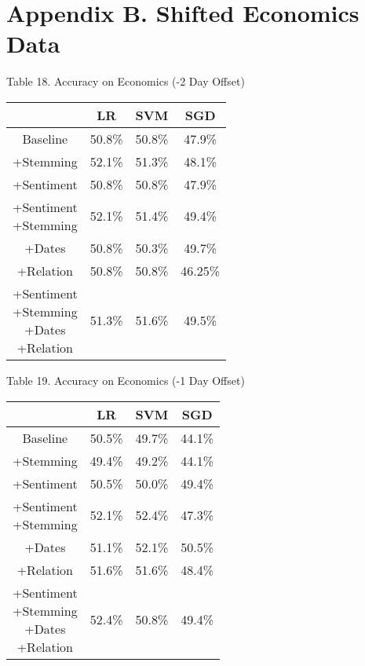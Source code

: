 \documentclass[11pt,a4paper]{article}
\begin{document}
\section{Appendix B. Shifted Economics Data}
\begin{center}
Table 18. Accuracy on Economics (-2 Day Offset)\\
\begin{tabular}{ |c|c|c|c| }
 \hline
  & LR & SVM & SGD \\
  \hline
  Baseline & 50.8\% & 50.8\% & 47.9\% \\
  \hline
 +Stemming & 52.1\% & 51.3\% & 48.1\% \\
  \hline
 +Sentiment & 50.8\% & 50.8\% & 47.9\% \\
  \hline
  \shortstack{+Sentiment \\ +Stemming} & 52.1\% & 51.4\% & 49.4\%\\
 \hline
 +Dates & 50.8\% & 50.3\% & 49.7\% \\
  \hline
 +Relation & 50.8\% & 50.8\% & 46.25\% \\
  \hline
  \shortstack{+Sentiment \\ +Stemming \\+Dates \\+Relation} & 51.3\% & 51.6\% & 49.5\% \\
 \hline
\end{tabular}
\end{center}

\begin{center}
Table 19. Accuracy on Economics (-1 Day Offset)\\
\begin{tabular}{ |c|c|c|c| }
 \hline
  & LR & SVM & SGD \\
  \hline
  Baseline & 50.5\% & 49.7\% & 44.1\% \\
  \hline
 +Stemming & 49.4\% & 49.2\% & 44.1\% \\
  \hline
 +Sentiment & 50.5\% & 50.0\% & 49.4\% \\
  \hline
  \shortstack{+Sentiment \\ +Stemming} & 52.1\% & 52.4\% & 47.3\%\\
 \hline
 +Dates & 51.1\% & 52.1\% & 50.5\% \\
  \hline
 +Relation & 51.6\% & 51.6\% & 48.4\% \\
  \hline
  \shortstack{+Sentiment \\ +Stemming \\+Dates \\+Relation} & 52.4\% & 50.8\% & 49.4\% \\
 \hline
\end{tabular}
\end{center}
\end{document}

